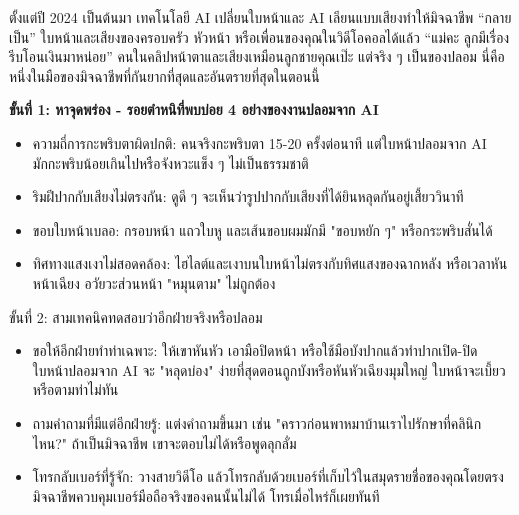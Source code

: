 
ตั้งแต่ปี 2024 เป็นต้นมา เทคโนโลยี AI เปลี่ยนใบหน้าและ AI เลียนแบบเสียงทำให้มิจฉาชีพ “กลายเป็น” ใบหน้าและเสียงของครอบครัว หัวหน้า หรือเพื่อนของคุณในวิดีโอคอลได้แล้ว “แม่คะ ลูกมีเรื่อง รีบโอนเงินมาหน่อย” คนในคลิปหน้าตาและเสียงเหมือนลูกชายคุณเป๊ะ แต่จริง ๆ เป็นของปลอม นี่คือหนึ่งในมือของมิจฉาชีพที่กันยากที่สุดและอันตรายที่สุดในตอนนี้

\textbf{ขั้นที่ 1: หาจุดพร่อง - รอยตำหนิที่พบบ่อย 4 อย่างของงานปลอมจาก AI}\par

\begin{itemize}
  \item ความถี่การกะพริบตาผิดปกติ: คนจริงกะพริบตา 15-20 ครั้งต่อนาที แต่ใบหน้าปลอมจาก AI มักกะพริบน้อยเกินไปหรือจังหวะแข็ง ๆ ไม่เป็นธรรมชาติ
  \item ริมฝีปากกับเสียงไม่ตรงกัน: ดูดี ๆ จะเห็นว่ารูปปากกับเสียงที่ได้ยินหลุดกันอยู่เสี้ยววินาที
  \item ขอบใบหน้าเบลอ: กรอบหน้า แถวใบหู และเส้นขอบผมมักมี "ขอบหยัก ๆ" หรือกระพริบสั่นได้
  \item ทิศทางแสงเงาไม่สอดคล้อง: ไฮไลต์และเงาบนใบหน้าไม่ตรงกับทิศแสงของฉากหลัง หรือเวลาหันหน้าเฉียง อวัยวะส่วนหน้า "หมุนตาม" ไม่ถูกต้อง
\end{itemize}

\begin{tcbinfo}{ขั้นที่ 2: สามเทคนิคทดสอบว่าอีกฝ่ายจริงหรือปลอม}
\begin{itemize}
  \item ขอให้อีกฝ่ายทำท่าเฉพาะ: ให้เขาหันหัว เอามือปิดหน้า หรือใช้มือบังปากแล้วทำปากเปิด-ปิด ใบหน้าปลอมจาก AI จะ "หลุดบ่อง" ง่ายที่สุดตอนถูกบังหรือหันหัวเฉียงมุมใหญ่ ใบหน้าจะเบี้ยวหรือตามท่าไม่ทัน
  \item ถามคำถามที่มีแต่อีกฝ่ายรู้: แต่งคำถามขึ้นมา เช่น "คราวก่อนพาหมาบ้านเราไปรักษาที่คลินิกไหน?" ถ้าเป็นมิจฉาชีพ เขาจะตอบไม่ได้หรือพูดลุกลั่ม
  \item โทรกลับเบอร์ที่รู้จัก: วางสายวิดีโอ แล้วโทรกลับด้วยเบอร์ที่เก็บไว้ในสมุดรายชื่อของคุณโดยตรง มิจฉาชีพควบคุมเบอร์มือถือจริงของคนนั้นไม่ได้ โทรเมื่อไหร่ก็เผยทันที
\end{itemize}

\end{tcbinfo}

